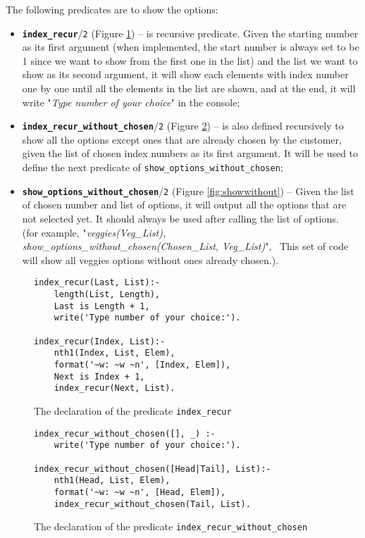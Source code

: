 \documentclass[12pt,a4paper]{article}
\newcommand{\varname}[1]{\texttt{#1}}
\newcommand{\varnamebf}[1]{\textbf{\texttt{#1}}}
\newcommand{\predprot}[2]{{\color{MidnightBlue}\varnamebf{#1}}/{\color{Mulberry}\varname{#2}}}
\newcommand{\predname}[1]{{\color{MidnightBlue}\varname{#1}}}
\begin{document}
The following predicates are to show the options:
\begin{itemize}
    \item \predprot{index\_recur}{2} (Figure \ref{fig:indexrecur}) -- is recursive predicate. Given the starting number as its first argument (when implemented, the start number is always set to be 1 since we want to show from the first one in the list) and the list we want to show as its second argument, it will show each elements with index number one by one until all the elements in the list are shown, and at the end, it will write "\textit{Type number of your choice}" in the console;
    
    \item \predprot{index\_recur\_without\_chosen}{2} (Figure \ref{fig:indexrecurwithout}) -- is also defined recursively to show all the options except ones that are already chosen by the customer, given the list of chosen index numbers as its first argument. It will be used to define the next predicate of \predname{show\_options\_without\_chosen};
    
    \item \predprot{show\_options\_without\_chosen}{2} (Figure \ref{fig:showwithout}) -- Given the list of chosen number and list of options, it will output all the options that are not selected yet. It should always be used after calling the list of options. \\ 
    (for example, "\textit{veggies(Veg\_List), show\_options\_without\_chosen(Chosen\_List, Veg\_List)}", 
    \  This set of code will show all veggies options without ones already chosen.).
\end{itemize}

\newpage

\begin{figure}[H]
	\centering
\begin{lstlisting}[style=Prolog-pygsty]
% Define index_recur
index_recur(Last, List):- 
    length(List, Length), 
    Last is Length + 1,
    write('Type number of your choice:').

index_recur(Index, List):- 
    nth1(Index, List, Elem),
    format('~w: ~w ~n', [Index, Elem]),
    Next is Index + 1,
    index_recur(Next, List).
\end{lstlisting}
	\caption{The declaration of the predicate \predname{index\_recur}} 
	\label{fig:indexrecur}
\end{figure}


\begin{figure}[H]
	\centering
\begin{lstlisting}[style=Prolog-pygsty]
% Define index_recur_without_chosen
index_recur_without_chosen([], _) :- 
    write('Type number of your choice:').

index_recur_without_chosen([Head|Tail], List):-
    nth1(Head, List, Elem),
    format('~w: ~w ~n', [Head, Elem]),
    index_recur_without_chosen(Tail, List).
\end{lstlisting}
	\caption{The declaration of the predicate \predname{index\_recur\_without\_chosen}} 
	\label{fig:indexrecurwithout}
\end{figure}
\end{document}
